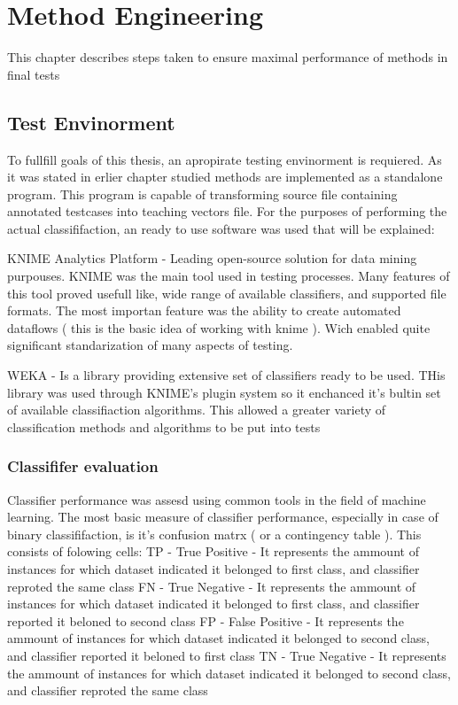 \chapter{Method Engineering}

This chapter describes steps taken to ensure maximal performance of methods in final tests

\section{ Test Envinorment }

To fullfill goals of this thesis, an apropirate testing envinorment is requiered. As it was stated in erlier chapter studied methods are implemented
as a standalone program. This program is capable of transforming source file containing annotated testcases into teaching vectors file. For the purposes of 
performing the actual classififaction, an ready to use software was used that will be explained:

KNIME Analytics Platform - Leading open-source solution for data mining purpouses.  KNIME was the main tool used in testing processes. 
Many features of this tool proved usefull like, wide range of available classifiers, and supported file formats. The most importan feature was the 
ability to create automated dataflows ( this is the basic idea of working with knime ). Wich enabled quite significant standarization of many aspects of
testing.

WEKA - Is a library providing extensive set of classifiers ready to be used. THis library was used through KNIME's plugin system so it enchanced it's
bultin set of available classifiaction algorithms. This allowed a greater variety of classification methods and algorithms to be put into tests
\subsection{ Classififer evaluation }

Classifier performance was assesd using common tools in the field of machine learning.  The most basic measure of classifier performance, especially in case
of binary classififaction, is it's confusion matrx ( or a contingency table ). This consists of folowing cells:
TP - True Positive - It represents the ammount of instances for which dataset indicated it belonged to first class, and classifier reproted the same class
FN - True Negative - It represents the ammount of instances for which dataset indicated it belonged to first class, and classifier reported it beloned to second class
FP - False Positive - It represents the ammount of instances for which dataset indicated it belonged to second class, and classifier reported it beloned to first class
TN - True Negative - It represents the ammount of instances for which dataset indicated it belonged to second class, and classifier reproted the same class

